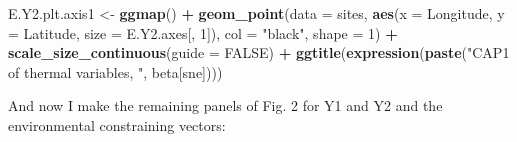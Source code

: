 \documentclass[10pt,A4,]{article}
\newenvironment{Shaded}{\begin{snugshade}}{\end{snugshade}}
\newcommand{\KeywordTok}[1]{\textcolor[rgb]{0.13,0.29,0.53}{\textbf{#1}}}
\newcommand{\DataTypeTok}[1]{\textcolor[rgb]{0.13,0.29,0.53}{#1}}
\newcommand{\DecValTok}[1]{\textcolor[rgb]{0.00,0.00,0.81}{#1}}
\newcommand{\StringTok}[1]{\textcolor[rgb]{0.31,0.60,0.02}{#1}}
\newcommand{\OtherTok}[1]{\textcolor[rgb]{0.56,0.35,0.01}{#1}}
\newcommand{\OperatorTok}[1]{\textcolor[rgb]{0.81,0.36,0.00}{\textbf{#1}}}
\newcommand{\NormalTok}[1]{#1}
\begin{document}
\begin{Shaded}
\begin{Highlighting}[]
\NormalTok{E.Y2.plt.axis1 <-}\StringTok{ }\KeywordTok{ggmap}\NormalTok{() }\OperatorTok{+}
\StringTok{  }\KeywordTok{geom_point}\NormalTok{(}\DataTypeTok{data =}\NormalTok{ sites, }\KeywordTok{aes}\NormalTok{(}\DataTypeTok{x =}\NormalTok{ Longitude, }\DataTypeTok{y =}\NormalTok{ Latitude, }\DataTypeTok{size =}\NormalTok{ E.Y2.axes[, }\DecValTok{1}\NormalTok{]),}
             \DataTypeTok{col =} \StringTok{"black"}\NormalTok{, }\DataTypeTok{shape =} \DecValTok{1}\NormalTok{) }\OperatorTok{+}
\StringTok{  }\KeywordTok{scale_size_continuous}\NormalTok{(}\DataTypeTok{guide =} \OtherTok{FALSE}\NormalTok{) }\OperatorTok{+}
\StringTok{  }\KeywordTok{ggtitle}\NormalTok{(}\KeywordTok{expression}\NormalTok{(}\KeywordTok{paste}\NormalTok{(}\StringTok{"CAP1 of thermal variables, "}\NormalTok{, beta[sne])))}
\end{Highlighting}
\end{Shaded}

And now I make the remaining panels of Fig. 2 for Y1 and Y2 and the
environmental constraining vectors:
\end{document}
